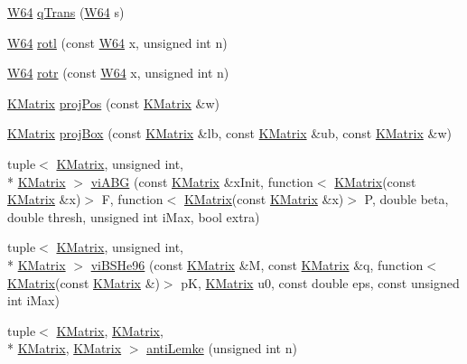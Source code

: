 \begin{DoxyCompactItemize}
\item 
\hyperlink{namespace_k_base_ad560ba73f29a481837375dfda23dca0d}{W64} \hyperlink{namespace_k_base_a0cc3f4cfaee8cdf53185d4be5ba8ee32}{q\-Trans} (\hyperlink{namespace_k_base_ad560ba73f29a481837375dfda23dca0d}{W64} s)
\item 
\hyperlink{namespace_k_base_ad560ba73f29a481837375dfda23dca0d}{W64} \hyperlink{namespace_k_base_ad60eea0f8cc6b41083e6ccee641a5191}{rotl} (const \hyperlink{namespace_k_base_ad560ba73f29a481837375dfda23dca0d}{W64} x, unsigned int n)
\item 
\hyperlink{namespace_k_base_ad560ba73f29a481837375dfda23dca0d}{W64} \hyperlink{namespace_k_base_a6c305ecb009d6de80a3b2c33c3df4b18}{rotr} (const \hyperlink{namespace_k_base_ad560ba73f29a481837375dfda23dca0d}{W64} x, unsigned int n)
\item 
\hyperlink{class_k_base_1_1_k_matrix}{K\-Matrix} \hyperlink{namespace_k_base_a6fb95714179551a7090ad6a283ea3a1d}{proj\-Pos} (const \hyperlink{class_k_base_1_1_k_matrix}{K\-Matrix} \&w)
\item 
\hyperlink{class_k_base_1_1_k_matrix}{K\-Matrix} \hyperlink{namespace_k_base_a7bdad0fb3ffd7c94d1fefc8fde46f469}{proj\-Box} (const \hyperlink{class_k_base_1_1_k_matrix}{K\-Matrix} \&lb, const \hyperlink{class_k_base_1_1_k_matrix}{K\-Matrix} \&ub, const \hyperlink{class_k_base_1_1_k_matrix}{K\-Matrix} \&w)
\item 
tuple$<$ \hyperlink{class_k_base_1_1_k_matrix}{K\-Matrix}, unsigned int, \\*
\hyperlink{class_k_base_1_1_k_matrix}{K\-Matrix} $>$ \hyperlink{namespace_k_base_a3947603d5e5f173f2538227da29abe9e}{vi\-A\-B\-G} (const \hyperlink{class_k_base_1_1_k_matrix}{K\-Matrix} \&x\-Init, function$<$ \hyperlink{class_k_base_1_1_k_matrix}{K\-Matrix}(const \hyperlink{class_k_base_1_1_k_matrix}{K\-Matrix} \&x)$>$ F, function$<$ \hyperlink{class_k_base_1_1_k_matrix}{K\-Matrix}(const \hyperlink{class_k_base_1_1_k_matrix}{K\-Matrix} \&x)$>$ P, double beta, double thresh, unsigned int i\-Max, bool extra)
\item 
tuple$<$ \hyperlink{class_k_base_1_1_k_matrix}{K\-Matrix}, unsigned int, \\*
\hyperlink{class_k_base_1_1_k_matrix}{K\-Matrix} $>$ \hyperlink{namespace_k_base_aacba76ea7b307a0249430feb7c0a5e99}{vi\-B\-S\-He96} (const \hyperlink{class_k_base_1_1_k_matrix}{K\-Matrix} \&M, const \hyperlink{class_k_base_1_1_k_matrix}{K\-Matrix} \&q, function$<$ \hyperlink{class_k_base_1_1_k_matrix}{K\-Matrix}(const \hyperlink{class_k_base_1_1_k_matrix}{K\-Matrix} \&)$>$ p\-K, \hyperlink{class_k_base_1_1_k_matrix}{K\-Matrix} u0, const double eps, const unsigned int i\-Max)
\item 
tuple$<$ \hyperlink{class_k_base_1_1_k_matrix}{K\-Matrix}, \hyperlink{class_k_base_1_1_k_matrix}{K\-Matrix}, \\*
\hyperlink{class_k_base_1_1_k_matrix}{K\-Matrix}, \hyperlink{class_k_base_1_1_k_matrix}{K\-Matrix} $>$ \hyperlink{namespace_k_base_adab8fcddf092266a086d7d4b35665047}{anti\-Lemke} (unsigned int n)
\end{DoxyCompactItemize}
